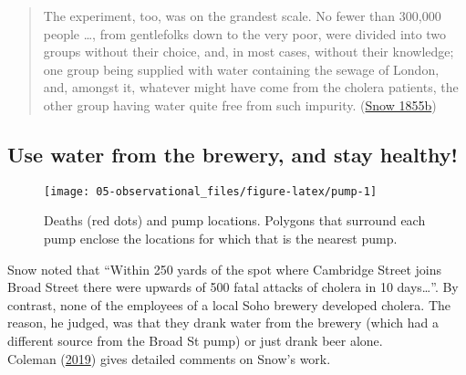\documentclass[
  10ptls,
  b5paper]{book}
\begin{document}

\begin{quote}
The experiment, too, was on the grandest scale. No fewer than 300,000 people \ldots, from gentlefolks down to the very poor, were divided into two groups without their choice, and, in most cases, without their knowledge; one group being supplied with water containing the sewage of London, and, amongst it, whatever might have come from the cholera patients, the other group having water quite free from such impurity. (\protect\hyperlink{ref-snow1855mode}{Snow 1855b})
\end{quote}

\hypertarget{use-water-from-the-brewery-and-stay-healthy}{%
\subsection*{Use water from the brewery, and stay healthy!}\label{use-water-from-the-brewery-and-stay-healthy}}

\begin{figure}[H]

{\centering \texttt{[image: 05-observational\_files/figure-latex/pump-1]} 

}

\caption{Deaths (red dots) and pump locations.  Polygons that surround
each pump enclose the locations for which that is the nearest pump.}\label{fig:pump}
\end{figure}

Snow noted that ``Within 250 yards of the spot where Cambridge Street joins Broad Street there were upwards of 500 fatal attacks of cholera in 10 days\ldots{}''. By contrast, none of the employees of a local Soho brewery developed cholera. The reason, he judged, was that they drank water from the brewery (which had a different source from the Broad St pump) or just drank beer alone.\\
Coleman (\protect\hyperlink{ref-coleman2019causality}{2019}) gives detailed comments on Snow's work.
\end{document}
